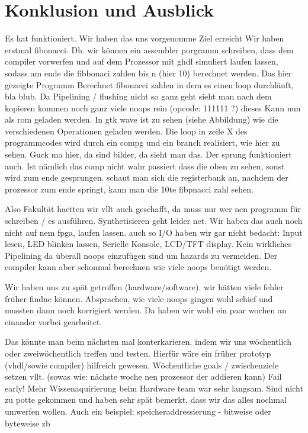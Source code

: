 \documentclass[paper=a4,fontsize=12pt,twocolumn]{scrreprt}
\begin{document}
\chapter{Konklusion und Ausblick}

Es hat funktioniert.
Wir haben das uns vorgenomme Ziel erreicht
Wir haben erstmal fibonacci. Dh. wir können ein assembler porgramm schreiben, dass dem compiler vorwerfen und auf dem Prozessor mit ghdl simuliert laufen lassen, sodass am ende die fibbonaci zahlen bis n (hier 10) berechnet werden.
Das hier gezeigte Programm Berechnet fibonacci zahlen in dem es einen loop durchläuft, bla blub.
Da Pipelining / flushing nicht so ganz geht sieht man nach dem kopieren kommen noch ganz viele noops rein (opcode: 111111 ?)
dieses Kann nun als rom geladen werden. In gtk wave ist zu sehen (siehe Abbildung) wie die verschiedenen Operationen geladen werden.
Die loop in zeile X des programmcodes wird durch ein compg und ein branch realisiert, wie hier zu sehen.
Guck ma hier, da sind bilder, da sieht man das.
Der sprung funktioniert auch. Ist nämlich das comp nicht wahr passiert dass die oben zu sehen, sonst wird zum ende gesprungen.
schaut man sich die registerbank an, nachdem der prozessor zum ende springt, kann man die 10te fibpnacci zahl sehen.

Also Fakultät haetten wir vllt auch geschafft, da muss nur wer nen programm für schreiben / es ausführen. Synthetisieren geht leider net. Wir haben das auch noch nicht auf nem fpga, laufen lassen. auch so I/O haben wir gar nicht bedacht: Input lesen, LED blinken lassen, Serielle Konsole, LCD/TFT display.
Kein wirkliches Pipelining da überall noops einzufügen sind um hazards zu vermeiden.
Der compiler kann aber schonmal berechnen wie viele noops benötigt werden.

Wir haben uns zu spät getroffen (hardware/software). wir hätten viele fehler früher findne können. Absprachen, wie viele noops gingen wohl schief und mussten dann noch korrigiert werden.
Da haben wir wohl ein paar wochen an einander vorbei gearbeitet.

Das könnte man beim nächsten mal konterkarieren, indem wir uns wöchentlich oder zweiwöchentlich treffen und testen.
Hierfür wäre ein früher prototyp (vhdl/sowie compiler) hilfreich gewesen.
Wöchentliche goals / zwischenziele setzen vllt. (sowas wie: nächste woche nen prozessor der addieren kann)
Fail early!
Mehr Wissenaquirierung beim Hardware team war sehr langsam.
Sind nicht zu potte gekommen und haben sehr spät bemerkt, dass wir das alles nochmal umwerfen wollen.
Auch ein beispiel: speicheraddressierung - bitweise oder byteweise zb
\end{document}
